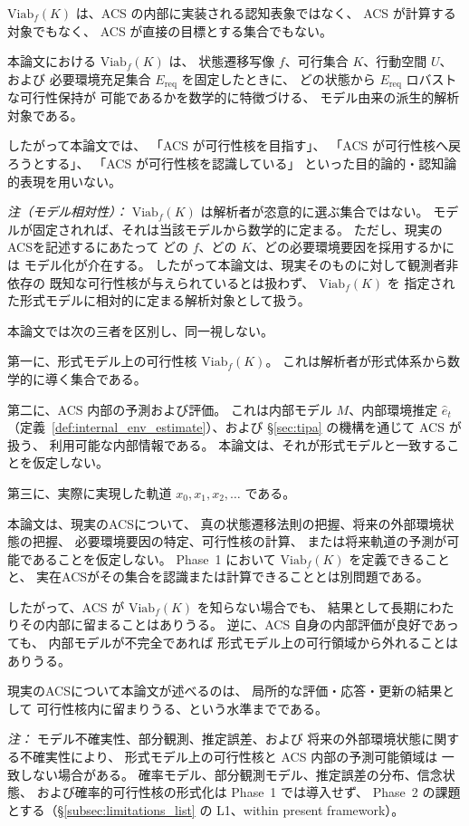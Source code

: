 \begin{remark}
\label{rem:viab_core_status}
$\mathrm{Viab}_f(K)$ は、ACS の内部に実装される認知表象ではなく、
ACS が計算する対象でもなく、
ACS が直接の目標とする集合でもない。

本論文における $\mathrm{Viab}_f(K)$ は、
状態遷移写像 $f$、可行集合 $K$、行動空間 $U$、および
必要環境充足集合 $E_{\mathrm{req}}$ を固定したときに、
どの状態から $E_{\mathrm{req}}$ ロバストな可行性保持が
可能であるかを数学的に特徴づける、
モデル由来の派生的解析対象である。

したがって本論文では、
「ACS が可行性核を目指す」、
「ACS が可行性核へ戻ろうとする」、
「ACS が可行性核を認識している」
といった目的論的・認知論的表現を用いない。

\textit{注（モデル相対性）：}
$\mathrm{Viab}_f(K)$ は解析者が恣意的に選ぶ集合ではない。
モデルが固定されれば、それは当該モデルから数学的に定まる。
ただし、現実のACSを記述するにあたって
どの $f$、どの $K$、どの必要環境要因を採用するかには
モデル化が介在する。
したがって本論文は、現実そのものに対して観測者非依存の
既知な可行性核が与えられているとは扱わず、
$\mathrm{Viab}_f(K)$ を
指定された形式モデルに相対的に定まる解析対象として扱う。
\end{remark}

\begin{remark}
\label{rem:three_layers}
本論文では次の三者を区別し、同一視しない。

第一に、形式モデル上の可行性核 $\mathrm{Viab}_f(K)$。
これは解析者が形式体系から数学的に導く集合である。

第二に、ACS 内部の予測および評価。
これは内部モデル $M$、内部環境推定 $\hat e_t$
（定義~\ref{def:internal_env_estimate}）、および
\S\ref{sec:tipa} の機構を通じて ACS が扱う、
利用可能な内部情報である。
本論文は、それが形式モデルと一致することを仮定しない。

第三に、実際に実現した軌道 $x_0,x_1,x_2,\ldots$ である。

本論文は、現実のACSについて、
真の状態遷移法則の把握、将来の外部環境状態の把握、
必要環境要因の特定、可行性核の計算、
または将来軌道の予測が可能であることを仮定しない。
Phase~1 において $\mathrm{Viab}_f(K)$ を定義できることと、
実在ACSがその集合を認識または計算できることとは別問題である。

したがって、ACS が $\mathrm{Viab}_f(K)$ を知らない場合でも、
結果として長期にわたりその内部に留まることはありうる。
逆に、ACS 自身の内部評価が良好であっても、
内部モデルが不完全であれば
形式モデル上の可行領域から外れることはありうる。

現実のACSについて本論文が述べるのは、
局所的な評価・応答・更新の結果として
可行性核内に留まりうる、という水準までである。

\textit{注：}
モデル不確実性、部分観測、推定誤差、および
将来の外部環境状態に関する不確実性により、
形式モデル上の可行性核と ACS 内部の予測可能領域は
一致しない場合がある。
確率モデル、部分観測モデル、推定誤差の分布、信念状態、
および確率的可行性核の形式化は Phase~1 では導入せず、
Phase~2 の課題とする（\S\ref{subsec:limitations_list} の L1、within present framework）。
\end{remark}


